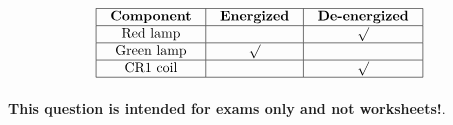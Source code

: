 






$$\vbox{\offinterlineskip
\halign{\strut
\vrule \quad\hfil # \ \hfil & 
\vrule \quad\hfil # \ \hfil & 
\vrule \quad\hfil # \ \hfil \vrule \cr
\noalign{\hrule}
%
{\bf Component} & {\bf Energized} & {\bf De-energized} \cr
%
\noalign{\hrule}
%
Red lamp &  & $\surd$ \cr
%
\noalign{\hrule}
%
Green lamp & $\surd$ &  \cr
%
\noalign{\hrule}
%
CR1 coil &  & $\surd$ \cr
%
\noalign{\hrule}
} %
}$$ %








{\bf This question is intended for exams only and not worksheets!}.


